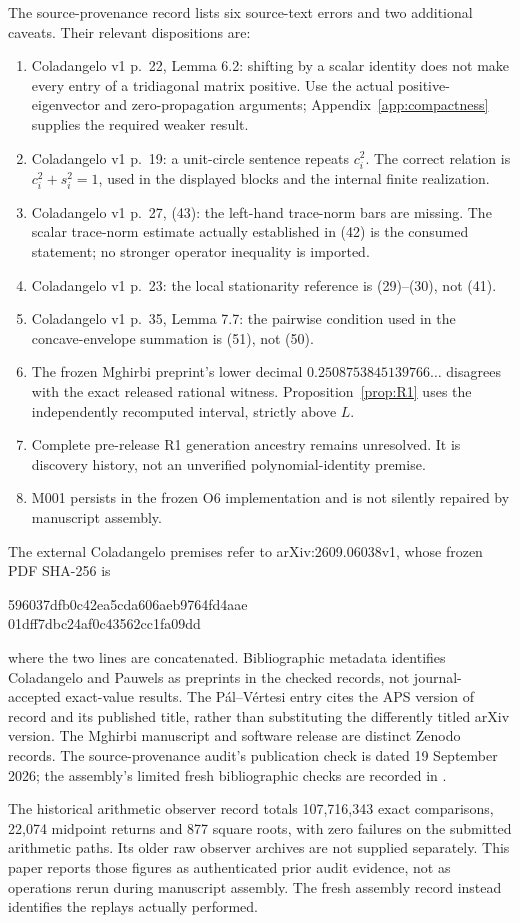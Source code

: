 The source-provenance record lists six source-text errors and two
additional caveats. Their relevant dispositions are:
\begin{enumerate}
\item Coladangelo v1 p.~22, Lemma 6.2: shifting by a scalar identity
does not make every entry of a tridiagonal matrix positive.
Use the actual positive-eigenvector and zero-propagation arguments;
Appendix~\ref{app:compactness} supplies the required weaker result.
\item Coladangelo v1 p.~19: a unit-circle sentence repeats \(c_i^2\).
The correct relation is \(c_i^2+s_i^2=1\), used in the displayed
blocks and the internal finite realization.
\item Coladangelo v1 p.~27, (43): the left-hand trace-norm bars are
missing. The scalar trace-norm estimate actually established in (42)
is the consumed statement; no stronger operator inequality is imported.
\item Coladangelo v1 p.~23: the local stationarity reference is
(29)--(30), not (41).
\item Coladangelo v1 p.~35, Lemma 7.7: the pairwise condition used
in the concave-envelope summation is (51), not (50).
\item The frozen Mghirbi preprint's lower decimal
\(0.2508753845139766\ldots\) disagrees with the exact released rational
witness. Proposition~\ref{prop:R1} uses the independently recomputed
interval, strictly above \(L\).
\item Complete pre-release R1 generation ancestry remains unresolved.
It is discovery history, not an unverified polynomial-identity premise.
\item M001 persists in the frozen O6 implementation and is not
silently repaired by manuscript assembly.
\end{enumerate}

The external Coladangelo premises refer to arXiv:2609.06038v1, whose
frozen PDF SHA-256 is
\begin{center}\small\ttfamily
596037dfb0c42ea5cda606aeb9764fd4aae\\
01dff7dbc24af0c43562cc1fa09dd
\end{center}
where the two lines are concatenated. Bibliographic metadata identifies
Coladangelo and Pauwels as preprints in the checked records, not
journal-accepted exact-value results. The P\'al--V\'ertesi entry cites
the APS version of record and its published title, rather than
substituting the differently titled arXiv version. The Mghirbi
manuscript and software release are distinct Zenodo records.
The source-provenance audit's publication check is dated
19 September 2026; the assembly's limited fresh bibliographic checks
are recorded in .

The historical arithmetic observer record totals 107,716,343
exact comparisons, 22,074 midpoint returns and 877 square roots,
with zero failures on the submitted arithmetic paths. Its older
raw observer archives are not supplied separately. This paper reports
those figures as authenticated prior audit evidence, not as operations
rerun during manuscript assembly. The fresh assembly record instead
identifies the replays actually performed.
